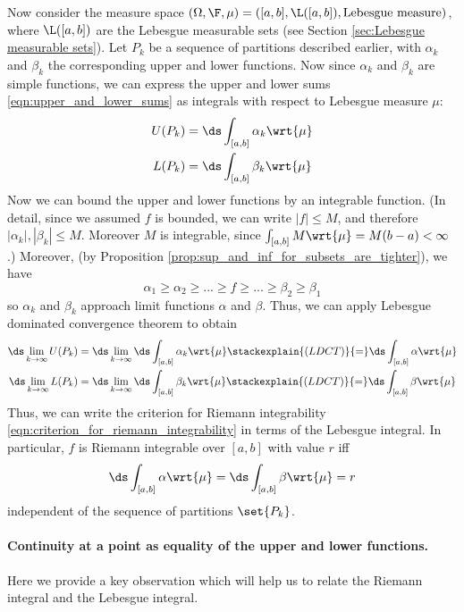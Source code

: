 \documentclass{article} %
\newcommand{\dmu}{\wrt{\mu}}
\begin{document}
Now consider the measure space $(\Omega, \F, \mu) = ([a,b], \L([a,b]), \text{Lebesgue measure})$, where $\L([a,b])$ are the Lebesgue measurable sets (see Section \ref{sec:Lebesgue measurable sets}).  Let $P_k$ be a sequence of partitions described earlier, with $\alpha_k$ and $\beta_k$ the corresponding upper and lower functions.  Now since $\alpha_k$ and $\beta_k$ are simple functions, we can express the upper and lower sums \eqref{eqn:upper_and_lower_sums} as integrals with respect to Lebesgue measure $\mu$:
\begin{align*}
U(P_k) &= \ds\int_{[a,b]} \alpha_k \dmu \\
L(P_k) &= \ds\int_{[a,b]} \beta_k \dmu \\		
\end{align*}
Now we can bound the upper and lower functions by an integrable function. {\tiny (In detail, since we assumed $f$ is bounded,  we can write $|f| \leq M$, and therefore $|\alpha_k|,|\beta_k| \leq M$.  Moreover $M$ is integrable, since $\int_{[a,b]} M \dmu = M(b-a) < \infty$.)} Moreover, {\tiny (by Proposition \ref{prop:sup_and_inf_for_subsets_are_tighter})}, we have 
\[ \alpha_1 \geq \alpha_2 \geq ... \geq f \geq ... \geq \beta_2 \geq \beta_1 \]
so $\alpha_k$ and $\beta_k$ approach limit functions $\alpha$ and $\beta$.   Thus, we can apply Lebesgue dominated convergence theorem to obtain
\begin{align*}
\ds\lim_{k \to \infty} U(P_k) &= \ds\lim_{k \to \infty} \ds\int_{[a,b]} \alpha_k \dmu \stackexplain{(LDCT)}{=}  \ds\int_{[a,b]} \alpha \dmu  \\
\ds\lim_{k \to \infty} L(P_k) &= \ds\lim_{k \to \infty} \ds\int_{[a,b]} \beta_k \dmu \stackexplain{(LDCT)}{=}  \ds\int_{[a,b]} \beta \dmu   \\	
\end{align*}
Thus, we can write the criterion for Riemann integrability \eqref{eqn:criterion_for_riemann_integrability} in terms of the Lebesgue integral.  In particular, $f$ is Riemann integrable over $[a,b]$ with value $r$ iff 
\begin{align}
\ds\int_{[a,b]} \alpha \dmu = \ds\int_{[a,b]} \beta \dmu  = r
\label{eqn:criterion_for_riemann_integrability_in_terms_of_lebesgue_integral}
\end{align}
independent of the sequence of partitions $\set{P_k}$.


\paragraph{Continuity at a point as equality of the upper and lower functions.}  Here we provide a key observation which will help us to relate the Riemann integral and the Lebesgue integral. 
\end{document}
